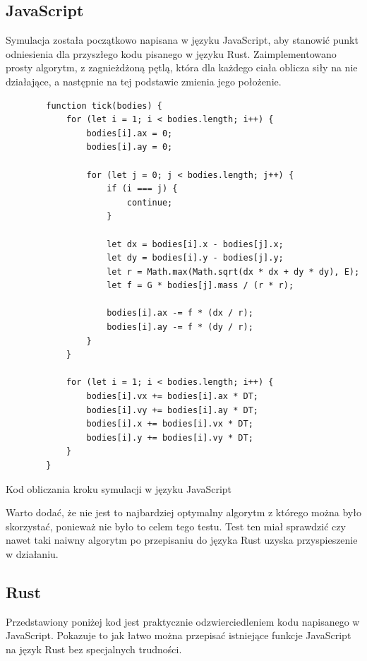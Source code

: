\documentclass[language=polish,type=master]{aghmodern}
\begin{document}
\subsection{JavaScript}
Symulacja została początkowo napisana w języku JavaScript, aby stanowić punkt odniesienia dla przyszłego kodu pisanego w języku Rust.
Zaimplementowano prosty algorytm, z zagnieżdżoną pętlą, która dla każdego ciała oblicza siły na nie działające, a następnie na tej podstawie zmienia jego położenie.

\begin{listing}[H]
    \begin{verbatim}
        function tick(bodies) {
            for (let i = 1; i < bodies.length; i++) {
                bodies[i].ax = 0;
                bodies[i].ay = 0;

                for (let j = 0; j < bodies.length; j++) {
                    if (i === j) {
                        continue;
                    }

                    let dx = bodies[i].x - bodies[j].x;
                    let dy = bodies[i].y - bodies[j].y;
                    let r = Math.max(Math.sqrt(dx * dx + dy * dy), E);
                    let f = G * bodies[j].mass / (r * r);

                    bodies[i].ax -= f * (dx / r);
                    bodies[i].ay -= f * (dy / r);
                }
            }

            for (let i = 1; i < bodies.length; i++) {
                bodies[i].vx += bodies[i].ax * DT;
                bodies[i].vy += bodies[i].ay * DT;
                bodies[i].x += bodies[i].vx * DT;
                bodies[i].y += bodies[i].vy * DT;
            }
        }
    \end{verbatim}
    \caption{Kod obliczania kroku symulacji w języku JavaScript}
\end{listing}

Warto dodać, że nie jest to najbardziej optymalny algorytm z którego można było skorzystać, ponieważ nie było to celem tego testu.
Test ten miał sprawdzić czy nawet taki naiwny algorytm po przepisaniu do języka Rust uzyska przyspieszenie w działaniu.

\subsection{Rust}
Przedstawiony poniżej kod jest praktycznie odzwierciedleniem kodu napisanego w JavaScript.
Pokazuje to jak łatwo można przepisać istniejące funkcje JavaScript na język Rust bez specjalnych trudności.
\end{document}
